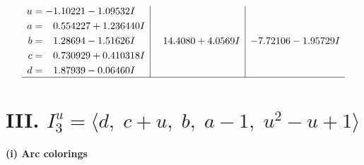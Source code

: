 \documentclass[1p]{elsarticle_modified}
\theoremstyle{definition}
\begin{document}
$$\begin{array}{c|c|c}
\begin{aligned}
u &= -1.10221 - 1.09532 I \\
a &= \phantom{-}0.554227 + 1.236440 I \\
b &= \phantom{-}1.28694 - 1.51626 I \\
c &= \phantom{-}0.730929 + 0.410318 I \\
d &= \phantom{-}1.87939 - 0.06460 I\end{aligned}
 & \phantom{-}14.4080 + 4.0569 I & -7.72106 - 1.95729 I\\
 \hline 
 \end{array}$$\newpage\newpage\renewcommand{\arraystretch}{1}
\centering \section*{III. $I^u_{3}= \langle d,\;c+u,\;b,\;a-1,\;u^2- u+1 \rangle$}
\flushleft \textbf{(i) Arc colorings}\\
\end{document}
